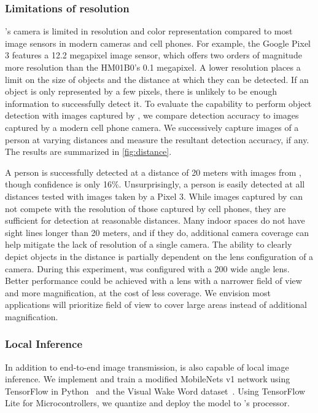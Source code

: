 \subsubsection{Limitations of resolution}
\name{}'s camera is limited in resolution and color representation compared to most image sensors in modern cameras and cell phones. For example, the Google Pixel 3 features a 12.2 megapixel image sensor, which offers two orders of magnitude more resolution than the HM01B0's 0.1 megapixel. A lower resolution places a limit on the size of objects and the distance at which they can be detected. If an object is only represented by a few pixels, there is unlikely to be enough information to successfully detect it. To evaluate the capability to perform object detection with images captured by \name{}, we compare detection accuracy to images captured by a modern cell phone camera. We successively capture images of a person at varying distances and measure the resultant detection accuracy, if any. The results are summarized in \cref{fig:distance}.

A person is successfully detected at a distance of 20 meters with images from \name{}, though confidence is only 16\%. Unsurprisingly, a person is easily detected at all distances tested with images taken by a Pixel 3. While images captured by \name{} can not compete with the resolution of those captured by cell phones, they are sufficient for detection at reasonable distances. Many indoor spaces do not have sight lines longer than 20 meters, and if they do, additional camera coverage can help mitigate the lack of resolution of a single camera. The ability to clearly depict objects in the distance is partially dependent on the lens configuration of a camera. During this experiment, \name{} was configured with a 200\textdegree\xspace wide angle lens. Better performance could be achieved with a lens with a narrower field of view and more magnification, at the cost of less coverage. We envision most applications will prioritize field of view to cover large areas instead of additional magnification.


\subsubsection{Local Inference}
\label{eval:localinf}
In addition to end-to-end image transmission, \name is also capable of local image inference. We implement and train a modified MobileNets v1 network using TensorFlow in Python~\cite{tensorflow2015-whitepaper} and the Visual Wake Word dataset~\cite{chowdhery2019visual}. Using TensorFlow Lite for Microcontrollers, we quantize and deploy the model to \name's processor.

